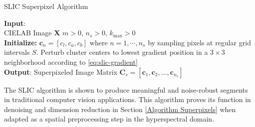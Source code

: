 \begin{algorithm}[H]
    \caption{SLIC Superpixel Algorithm}
    \textbf{Input}: \\
    \quad CIELAB Image $\mathbf{X}$
    \quad  $m > 0$, $n_s > 0$, $k_{\text{max}} > 0$
    \\
    \textbf{Initialize:} $\mathbf{c}_n = [c_{l}, c_{a}, c_{b}]$ where $n = 1, \cdots, n_s$ by sampling pixels at regular grid intervals $S$. Perturb cluster centers to lowest gradient position in a $3 \times 3$ neighborhood according to \eqref{eq:slic-gradient} \\
    
    \textbf{Output}: Superpixeled Image Matrix $\mathbf{C}_s = [\mathbf{c}_1, \mathbf{c}_2, \dots, \mathbf{c}_{n_s}]$
\end{algorithm}

The SLIC algorithm is shown to produce meaningful and noise-robust segments in traditional computer vision applications. This algorithm proves its function in denoising and dimension reduction in Section \ref{Algorithm Superpixels} when adapted as a spatial preprocessing step in the hyperspectral domain.
